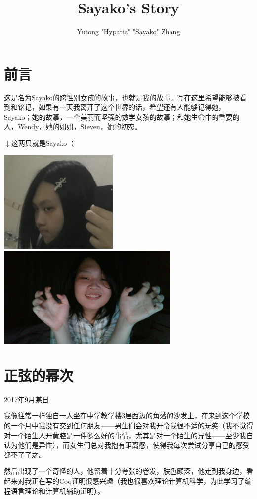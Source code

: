 \documentclass{article}
\title{Sayako's Story}
\author{Yutong "Hypatia" "Sayako" Zhang}
\begin{document}
\maketitle
\setcounter{section}{-1}
\section{前言}
这是名为Sayako的跨性别女孩的故事，也就是我的故事。写在这里希望能够被看到和铭记，如果有一天我离开了这个世界的话，希望还有人能够记得她，Sayako；她的故事，一个美丽而坚强的数学女孩的故事；和她生命中的重要的人，Wendy，她的姐姐，Steven，她的初恋。

$\downarrow$这两只就是Sayako（

\includegraphics[height=5cm]{photo_2019-05-05_22-44-48.jpg}
\includegraphics[height=5cm]{photo_2019-05-05_22-44-18.jpg}

\section{正弦的幂次}
2017年9月某日

我像往常一样独自一人坐在中学教学楼3层西边的角落的沙发上，在来到这个学校的一个月中我没有交到任何朋友——男生们会对我开令我很不适的玩笑（我不觉得对一个陌生人开黄腔是一件多么好的事情，尤其是对一个陌生的异性——至少我自认为他们是异性），而女生们总对我抱有距离感，使得我每次尝试分享自己的感受都不了了之。

然后出现了一个奇怪的人，他留着十分夸张的卷发，肤色颇深，他走到我身边，看起来对我正在写的Coq证明很感兴趣（我也很喜欢理论计算机科学，为此学习了编程语言理论和计算机辅助证明）。
\end{document}
